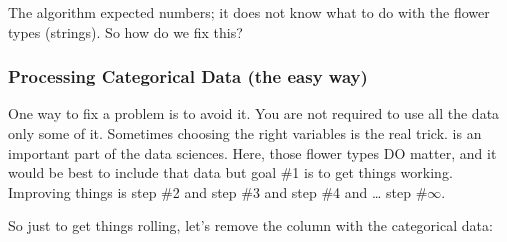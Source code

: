 \documentclass[letterpaper,10pt,english]{jupyterBook}
\begin{document}
\sphinxAtStartPar
{}

\sphinxAtStartPar
The algorithm expected numbers; it does not know what to do with the flower types (strings). So how do we fix this?


\subsubsection{Processing Categorical Data (the easy way)}
\label{\detokenize{task2_c/example_sup_reg/sup_reg_ex_develop:processing-categorical-data-the-easy-way}}\label{\detokenize{task2_c/example_sup_reg/sup_reg_ex_develop:sup-reg-ex-develop-train-categorical-1}}
\sphinxAtStartPar
One way to fix a problem is to avoid it. You are not required to use all the data \sphinxhyphen{}only some of it. Sometimes choosing the right variables is the real trick.  is an important part of the data sciences. Here, those flower types DO matter, and it would be best to include that data \sphinxhyphen{}but goal \#1 is to get things working. Improving things is step \#2 and step \#3 and step \#4 and … step \(\# \infty\).

\sphinxAtStartPar
So just to get things rolling, let’s remove the column with the categorical data:
\end{document}
